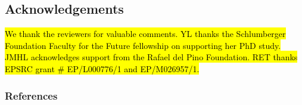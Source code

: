\documentclass{article} %
\begin{document}




\subsection*{Acknowledgements}
\hl{We thank the reviewers for valuable comments. YL thanks the Schlumberger Foundation Faculty for the Future fellowship on supporting her PhD study. JMHL acknowledges support from the Rafael del Pino Foundation. RET thanks EPSRC grant \# EP/L000776/1 and EP/M026957/1. }

\subsubsection*{References}
\renewcommand{\section}[2]{}
\small
 
%

\end{document}
